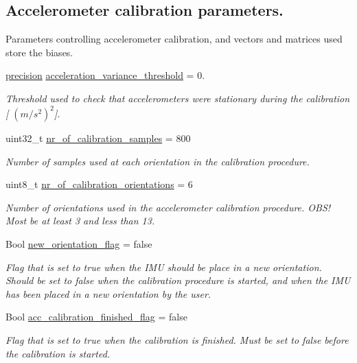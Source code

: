 \subsection*{\-Accelerometer calibration parameters.}
\label{_amgrp498a39b5e61b8b18fd67982a4b1746b8}%
 \-Parameters controlling accelerometer calibration, and vectors and matrices used store the biases. \begin{DoxyCompactItemize}
\item 
\hyperlink{nav__types_8h_a37e1884b1f06826c49607cec459b4e8a}{precision} \hyperlink{group__tables_gad5049be4d6ed3b9f92063c6ca6413b46}{acceleration\-\_\-variance\-\_\-threshold} = 0.
\begin{DoxyCompactList}\small\item\em \-Threshold used to check that accelerometers were stationary during the calibration \mbox{[} $(m/s^2)^2$\mbox{]}. \end{DoxyCompactList}\item 
uint32\-\_\-t \hyperlink{group__tables_gab9d05ce5927a225127eff6993856da19}{nr\-\_\-of\-\_\-calibration\-\_\-samples} = 800
\begin{DoxyCompactList}\small\item\em \-Number of samples used at each orientation in the calibration procedure. \end{DoxyCompactList}\item 
uint8\-\_\-t \hyperlink{group__tables_ga642a3ad33a0242f4e12fe46a13b0303f}{nr\-\_\-of\-\_\-calibration\-\_\-orientations} = 6
\begin{DoxyCompactList}\small\item\em \-Number of orientations used in the accelerometer calibration procedure. \-O\-B\-S! \-Most be at least 3 and less than 13. \end{DoxyCompactList}\item 
\-Bool \hyperlink{group__tables_ga9340627920ea2445fe1469547bc64eae}{new\-\_\-orientation\-\_\-flag} = false
\begin{DoxyCompactList}\small\item\em \-Flag that is set to true when the \-I\-M\-U should be place in a new orientation. \-Should be set to false when the calibration procedure is started, and when the \-I\-M\-U has been placed in a new orientation by the user. \end{DoxyCompactList}\item 
\-Bool \hyperlink{group__tables_gaa3b35b0b909a9a4b40d82658fab54349}{acc\-\_\-calibration\-\_\-finished\-\_\-flag} = false
\begin{DoxyCompactList}\small\item\em \-Flag that is set to true when the calibration is finished. \-Must be set to false before the calibration is started. \end{DoxyCompactList}\end{DoxyCompactItemize}
